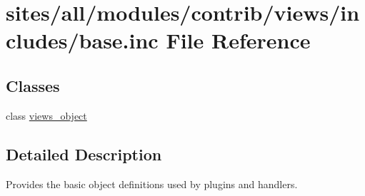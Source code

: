 \hypertarget{base_8inc}{
\section{sites/all/modules/contrib/views/includes/base.inc File Reference}
\label{base_8inc}
}
\subsection*{Classes}
\begin{CompactItemize}
\item 
class \hyperlink{classviews__object}{views\_\-object}
\end{CompactItemize}


\subsection{Detailed Description}
Provides the basic object definitions used by plugins and handlers. 